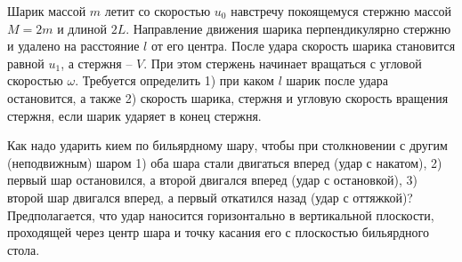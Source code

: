 \begin{ex}
Шарик массой $m$ летит со скоростью $u_0$ навстречу покоящемуся стержню массой $M = 2m$ и длиной $2L$. Направление движения шарика перпендикулярно стержню и удалено на расстояние $l$ от его центра. После удара скорость шарика становится равной $u_1$, а стержня -- $V$. При этом стержень начинает вращаться с угловой скоростью $\omega$. Требуется определить 1) при каком $l$ шарик после удара остановится, а также 2) скорость шарика, стержня и угловую скорость вращения стержня, если шарик ударяет в конец стержня.
\begin{ans}

\end{ans}
\end{ex}

\begin{ex}
Как надо ударить кием по бильярдному шару, чтобы при столкновении с другим (неподвижным) шаром 1) оба шара стали двигаться вперед (удар с накатом), 2) первый шар остановился, а второй двигался вперед (удар с остановкой), 3) второй шар двигался вперед, а первый откатился назад (удар с оттяжкой)? Предполагается, что удар наносится горизонтально в вертикальной плоскости, проходящей через центр шара и точку касания его с плоскостью бильярдного стола.
\begin{ans}

\end{ans}
\end{ex}